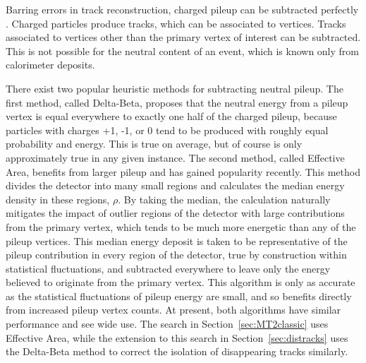     Barring errors in track reconstruction, charged pileup can be subtracted perfectly \cite{pileup}.
    Charged particles produce tracks, which can be associated to vertices.
    Tracks associated to vertices other than the primary vertex of interest can be subtracted.
    This is not possible for the neutral content of an event, which is known only from calorimeter deposits.
    
    There exist two popular heuristic methods for subtracting neutral pileup.
    The first method, called Delta-Beta, proposes that the neutral energy from a pileup vertex is equal everywhere to exactly one half of the charged pileup, because particles with charges +1, -1, or 0 tend to be produced with roughly equal probability and energy.
    This is true on average, but of course is only approximately true in any given instance.
    The second method, called Effective Area, benefits from larger pileup and has gained popularity recently.
    This method divides the detector into many small regions and calculates the median energy density in these regions, $\rho$.
    By taking the median, the calculation naturally mitigates the impact of outlier regions of the detector with large contributions from the primary vertex, which tends to be much more energetic than any of the pileup vertices.
    This median energy deposit is taken to be representative of the pileup contribution in every region of the detector, true by construction within statistical fluctuations, and subtracted everywhere to leave only the energy believed to originate from the primary vertex.
    This algorithm is only as accurate as the statistical fluctuations of pileup energy are small, and so benefits directly from increased pileup vertex counts.
    At present, both algorithms have similar performance and see wide use.
    The search in Section~\ref{sec:MT2classic} uses Effective Area, while the extension to this search in Section~\ref{sec:distracks} uses the Delta-Beta method to correct the isolation of disappearing tracks similarly.

